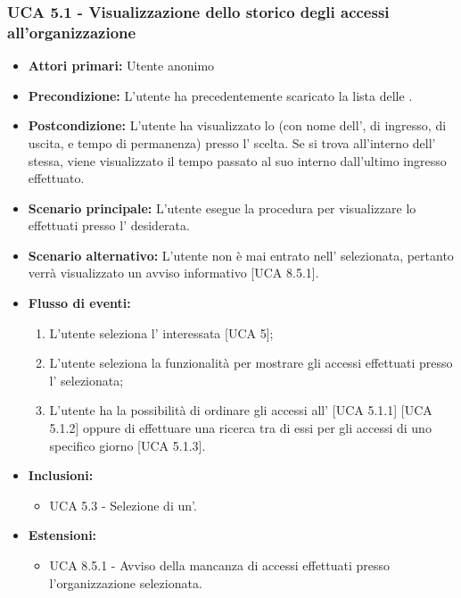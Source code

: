 \subsubsection{UCA 5.1 - Visualizzazione dello storico degli accessi all'organizzazione}
\begin{itemize}
    \item \textbf{Attori primari:} Utente anonimo
    \item \textbf{Precondizione:} L'utente ha precedentemente scaricato la lista delle .
    \item \textbf{Postcondizione:} L'utente ha visualizzato lo  (con nome dell',  di ingresso, di uscita, e tempo di permanenza) presso l' scelta. Se si trova all'interno dell' stessa, viene visualizzato il tempo passato al suo interno dall'ultimo ingresso effettuato.
    \item \textbf{Scenario principale:} L'utente esegue la procedura per visualizzare lo  effettuati presso l' desiderata.
    \item \textbf{Scenario alternativo:} L'utente non è mai entrato nell' selezionata, pertanto verrà visualizzato un avviso informativo [UCA 8.5.1].
    \item \textbf{Flusso di eventi:}
    \begin{enumerate}
        \item L'utente seleziona l' interessata [UCA 5];
        \item L'utente seleziona la funzionalità per mostrare gli accessi effettuati presso l' selezionata;
        \item L'utente ha la possibilità di ordinare gli accessi all' [UCA 5.1.1] [UCA 5.1.2] oppure di effettuare una ricerca tra di essi per gli accessi di uno specifico giorno [UCA 5.1.3].
    \end{enumerate}
    \item \textbf{Inclusioni:}
    \begin{itemize}
        \item UCA 5.3 - Selezione di un'.
    \end{itemize}
    \item \textbf{Estensioni:}
    \begin{itemize}
        \item UCA 8.5.1 - Avviso della mancanza di accessi effettuati presso l'organizzazione selezionata.
    \end{itemize}
\end{itemize}

